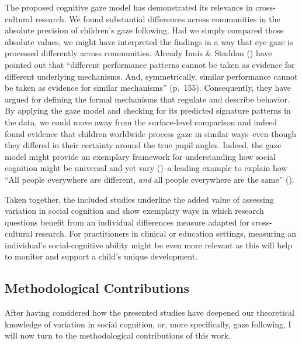 \documentclass[
]{scrbook}
\begin{document}
The proposed cognitive gaze model has demonstrated its relevance in cross-cultural research. We found substantial differences across communities in the absolute precision of children's gaze following. Had we simply compared those absolute values, we might have interpreted the findings in a way that eye gaze is processed differently across communities. Already Innis \& Staddon () have pointed out that ``different performance patterns cannot be taken as evidence for different underlying mechanisms. And, symmetrically, similar performance cannot be taken as evidence for similar mechanisms'' (p.~155). Consequently, they have argued for defining the formal mechanisms that regulate and describe behavior. By applying the gaze model and checking for its predicted signature patterns in the data, we could move away from the surface-level comparison and indeed found evidence that children worldwide process gaze in similar ways\thinspace --\thinspace even though they differed in their certainty around the true pupil angles. Indeed, the gaze model might provide an exemplary framework for understanding how social cognition might be universal and yet vary ()\thinspace --\thinspace a leading example to explain how ``All people everywhere are different, \emph{and} all people everywhere are the same'' ().

Taken together, the included studies underline the added value of assessing variation in social cognition and show exemplary ways in which research questions benefit from an individual differences measure adapted for cross-cultural research. For practitioners in clinical or education settings, measuring an individual's social-cognitive ability might be even more relevant as this will help to monitor and support a child's unique development.

\subsection{Methodological Contributions}\label{contributions-methods}

After having considered how the presented studies have deepened our theoretical knowledge of variation in social cognition, or, more specifically, gaze following, I will now turn to the methodological contributions of this work.
\end{document}
